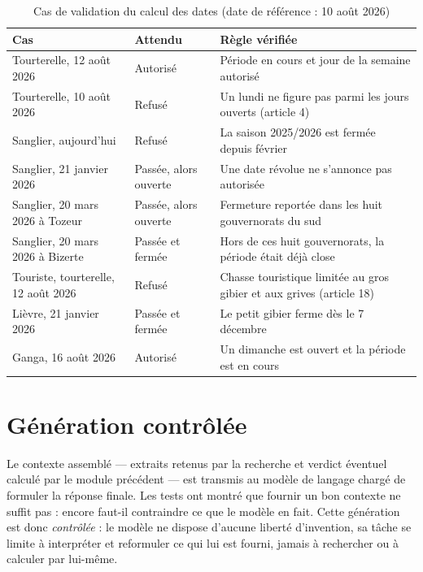 \begin{table}[h]
\centering
\caption{Cas de validation du calcul des dates (date de référence :
10 août 2026)}
\label{tab:cas-calendrier}
\begin{tabular}{|p{4.9cm}|p{2.4cm}|p{6.1cm}|}
\hline
\textbf{Cas} & \textbf{Attendu} & \textbf{Règle vérifiée} \\
\hline
Tourterelle, 12 août 2026 & Autorisé & Période en cours et jour de la semaine
autorisé \\
\hline
Tourterelle, 10 août 2026 & Refusé & Un lundi ne figure pas parmi les jours
ouverts (article 4) \\
\hline
Sanglier, aujourd'hui & Refusé & La saison 2025/2026 est fermée depuis
février \\
\hline
Sanglier, 21 janvier 2026 & Passée, alors ouverte & Une date révolue ne
s'annonce pas autorisée \\
\hline
Sanglier, 20 mars 2026 à Tozeur & Passée, alors ouverte & Fermeture reportée
dans les huit gouvernorats du sud \\
\hline
Sanglier, 20 mars 2026 à Bizerte & Passée et fermée & Hors de ces huit
gouvernorats, la période était déjà close \\
\hline
Touriste, tourterelle, 12 août 2026 & Refusé & Chasse touristique limitée au
gros gibier et aux grives (article 18) \\
\hline
Lièvre, 21 janvier 2026 & Passée et fermée & Le petit gibier ferme dès le
7 décembre \\
\hline
Ganga, 16 août 2026 & Autorisé & Un dimanche est ouvert et la période est en
cours \\
\hline
\end{tabular}
\end{table}


\section{Génération contrôlée}
\label{sec:generation}

Le contexte assemblé — extraits retenus par la recherche et verdict éventuel
calculé par le module précédent — est transmis au modèle de langage chargé de
formuler la réponse finale. Les tests ont montré que fournir un bon contexte ne
suffit pas : encore faut-il contraindre ce que le modèle en fait. Cette
génération est donc \emph{contrôlée} : le modèle ne dispose d'aucune liberté
d'invention, sa tâche se limite à interpréter et reformuler ce qui lui est
fourni, jamais à rechercher ou à calculer par lui-même.

